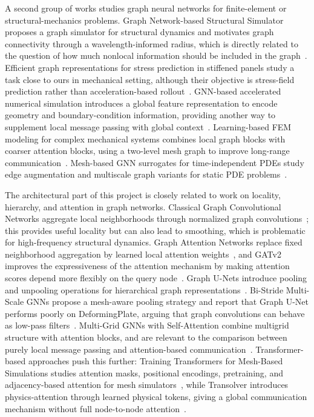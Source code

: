 \documentclass[11pt,a4paper,reqno]{amsart}
\theoremstyle{definition}
\theoremstyle{remark}
\numberwithin{equation}{section}
\begin{document}
A second group of works studies graph neural networks for finite-element or structural-mechanics problems. Graph Network-based Structural Simulator proposes a graph simulator for structural dynamics and motivates graph connectivity through a wavelength-informed radius, which is directly related to the question of how much nonlocal information should be included in the graph~\cite{gnss_structural}. Efficient graph representations for stress prediction in stiffened panels study a task close to ours in mechanical setting, although their objective is stress-field prediction rather than acceleration-based rollout~\cite{stiffened_panels}. GNN-based accelerated numerical simulation introduces a global feature representation to encode geometry and boundary-condition information, providing another way to supplement local message passing with global context~\cite{gnn_accelerated_simulation}. Learning-based FEM modeling for complex mechanical systems combines local graph blocks with coarser attention blocks, using a two-level mesh graph to improve long-range communication~\cite{learning_based_fem}. Mesh-based GNN surrogates for time-independent PDEs study edge augmentation and multiscale graph variants for static PDE problems~\cite{mesh_gnn_pdes}.

The architectural part of this project is closely related to work on locality, hierarchy, and attention in graph networks. Classical Graph Convolutional Networks aggregate local neighborhoods through normalized graph convolutions~\cite{gcn}; this provides useful locality but can also lead to smoothing, which is problematic for high-frequency structural dynamics. Graph Attention Networks replace fixed neighborhood aggregation by learned local attention weights~\cite{gat}, and GATv2 improves the expressiveness of the attention mechanism by making attention scores depend more flexibly on the query node~\cite{gatv2}. Graph U-Nets introduce pooling and unpooling operations for hierarchical graph representations~\cite{graphunet}.
Bi-Stride Multi-Scale GNNs propose a mesh-aware pooling strategy and report that Graph U-Net performs poorly on DeformingPlate, arguing that graph convolutions can behave as low-pass filters~\cite{bsms_gnn}. Multi-Grid GNNs with Self-Attention combine multigrid structure with attention blocks, and are relevant to the comparison between purely local message passing and attention-based communication~\cite{multigrid_self_attention}. Transformer-based approaches push this further: Training Transformers for Mesh-Based Simulations studies attention masks, positional encodings, pretraining, and adjacency-based attention for mesh simulators~\cite{training_transformers_mesh}, while Transolver introduces physics-attention through learned physical tokens, giving a global communication mechanism without full node-to-node attention~\cite{transolver}.
\end{document}
